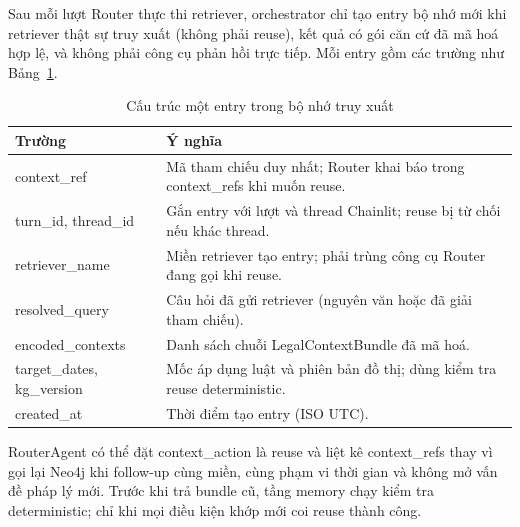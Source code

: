 \documentclass[../DoAn.tex]{subfiles}
\begin{document}
Sau mỗi lượt Router thực thi retriever, orchestrator chỉ tạo entry bộ nhớ mới khi retriever thật sự truy xuất (không phải reuse), kết quả có gói căn cứ đã mã hoá hợp lệ, và không phải công cụ phản hồi trực tiếp. Mỗi entry gồm các trường như Bảng~\ref{tab:retrieval_memory_entry}.

\begin{table}[H]
\centering
\footnotesize
\renewcommand{\arraystretch}{1.08}
\begin{tabularx}{\textwidth}{|>{\raggedright\arraybackslash}p{3.8cm}|>{\raggedright\arraybackslash}X|}
\hline
\textbf{Trường} & \textbf{Ý nghĩa} \\ \hline
context\_ref &
Mã tham chiếu duy nhất; Router khai báo trong context\_refs khi muốn reuse. \\ \hline
turn\_id, thread\_id &
Gắn entry với lượt và thread Chainlit; reuse bị từ chối nếu khác thread. \\ \hline
retriever\_name &
Miền retriever tạo entry; phải trùng công cụ Router đang gọi khi reuse. \\ \hline
resolved\_query &
Câu hỏi đã gửi retriever (nguyên văn hoặc đã giải tham chiếu). \\ \hline
encoded\_contexts &
Danh sách chuỗi LegalContextBundle đã mã hoá. \\ \hline
target\_dates, kg\_version &
Mốc áp dụng luật và phiên bản đồ thị; dùng kiểm tra reuse deterministic. \\ \hline
created\_at &
Thời điểm tạo entry (ISO UTC). \\ \hline
\end{tabularx}
\caption{Cấu trúc một entry trong bộ nhớ truy xuất}
\label{tab:retrieval_memory_entry}
\end{table}

RouterAgent có thể đặt context\_action là reuse và liệt kê context\_refs thay vì gọi lại Neo4j khi follow-up cùng miền, cùng phạm vi thời gian và không mở vấn đề pháp lý mới. Trước khi trả bundle cũ, tầng memory chạy kiểm tra deterministic; chỉ khi mọi điều kiện khớp mới coi reuse thành công.
\end{document}
